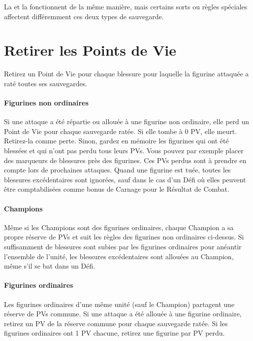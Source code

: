 La \regeneration{} et la \wardsave{} fonctionnent de la même manière, mais certains sorts ou règles spéciales affectent différemment ces deux types de sauvegarde.

\newpage
\section{Retirer les Points de Vie}

Retirez un Point de Vie pour chaque blessure pour laquelle la figurine attaquée a raté toutes ses sauvegardes.

\paragraph{Figurines non ordinaires}

Si une attaque a été répartie ou allouée à une figurine non ordinaire, elle perd un Point de Vie pour chaque sauvegarde ratée. Si elle tombe à 0 PV, elle meurt. Retirez-la comme perte. Sinon, gardez en mémoire les figurines qui ont été blessées et qui n'ont pas perdu tous leurs PVs. Vous pouvez par exemple placer des marqueurs de blessures près des figurines. Ces PVs perdus sont à prendre en compte lors de prochaines attaques. Quand une figurine est tuée, toutes les blessures excédentaires sont ignorées, sauf dans le cas d'un Défi où elles peuvent être comptabilisées comme bonus de Carnage pour le Résultat de Combat. 

\paragraph{Champions}

Même si les Champions sont des figurines ordinaires, chaque Champion a sa propre réserve de PVs et suit les règles des figurines non ordinaires ci-dessus. Si suffisamment de blessures sont subies par les figurines ordinaires pour anéantir l'ensemble de l'unité, les blessures excédentaires sont allouées au Champion, même s'il se bat dans un Défi.

\paragraph{Figurines ordinaires}

Les figurines ordinaires d'une même unité (sauf le Champion) partagent une réserve de PVs commune. Si une attaque a été allouée à une figurine ordinaire, retirez un PV de la réserve commune pour chaque sauvegarde ratée. Si les figurines ordinaires ont 1 PV chacune, retirez une figurine par PV perdu.

